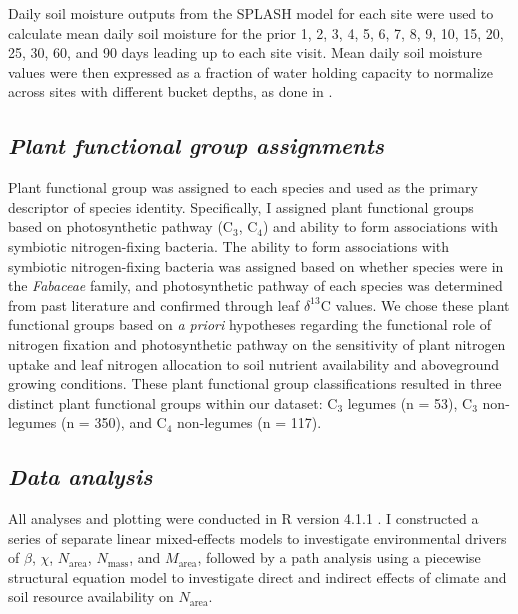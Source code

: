 Daily soil moisture outputs from the SPLASH model for each site were used to calculate mean daily soil moisture for the prior 1, 2, 3, 4, 5, 6, 7, 8, 9, 10, 15, 20, 25, 30, 60, and 90 days leading up to each site visit. Mean daily soil moisture values were then expressed as a fraction of water holding capacity to normalize across sites with different bucket depths, as done in .

\subsection{\textit{Plant functional group assignments}}
Plant functional group was assigned to each species and used as the primary descriptor of species identity. Specifically, I assigned plant functional groups based on photosynthetic pathway (C$_3$, C$_4$) and ability to form associations with symbiotic nitrogen-fixing bacteria. The ability to form associations with symbiotic nitrogen-fixing bacteria was assigned based on whether species were in the \textit{Fabaceae} family, and photosynthetic pathway of each species was determined from past literature and confirmed through leaf $\delta^{13}$C values. We chose these plant functional groups based on \textit{a priori} hypotheses regarding the functional role of nitrogen fixation and photosynthetic pathway on the sensitivity of plant nitrogen uptake and leaf nitrogen allocation to soil nutrient availability and aboveground growing conditions. These plant functional group classifications resulted in three distinct plant functional groups within our dataset: C$_3$ legumes (n = 53), C$_3$ non-legumes (n = 350), and C$_4$ non-legumes (n = 117).

\subsection{\textit{Data analysis}}
All analyses and plotting were conducted in R version 4.1.1 . I constructed a series of separate linear mixed-effects models to investigate environmental drivers of $\beta$, $\chi$, $N_\mathrm{area}$, $N_\mathrm{mass}$, and $M_\mathrm{area}$, followed by a path analysis using a piecewise structural equation model to investigate direct and indirect effects of climate and soil resource availability on $N_\mathrm{area}$.

